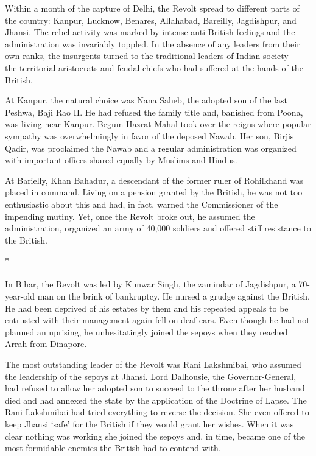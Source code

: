 \begin{multicols}{2}
Within a month of the capture of Delhi, the Revolt spread to different parts of the country: Kanpur, Lucknow, Benares, Allahabad, Bareilly, Jagdishpur, and Jhansi. The rebel activity was marked by intense anti-British feelings and the administration was invariably toppled. In the absence of any leaders from their own ranks, the insurgents turned to the traditional leaders of Indian society --- the territorial aristocrats and feudal chiefs who had suffered at the hands of the British.

At Kanpur, the natural choice was Nana Saheb, the adopted son of the last Peshwa, Baji Rao II. He had refused the family title and, banished from Poona, was living near Kanpur. Begum Hazrat Mahal took over the reigns where popular sympathy was overwhelmingly in favor of the deposed Nawab. Her son, Birjis Qadir, was proclaimed the Nawab and a regular administration was organized with important offices shared equally by Muslims and Hindus.

At Barielly, Khan Bahadur, a descendant of the former ruler of Rohilkhand was placed in command. Living on a pension granted by the British, he was not too enthusiastic about this and had, in fact, warned the Commissioner of the impending mutiny. Yet, once the Revolt broke out, he assumed the administration, organized an army of 40,000 soldiers and offered stiff resistance to the British.

\begin{center}*\end{center}

\paragraph*{}
In Bihar, the Revolt was led by Kunwar Singh, the zamindar of Jagdishpur, a 70-year-old man on the brink of bankruptcy. He nursed a grudge against the British. He had been deprived of his estates by them and his repeated appeals to be entrusted with their management again fell on deaf ears. Even though he had not planned an uprising, he unhesitatingly joined the sepoys when they reached Arrah from Dinapore.

The most outstanding leader of the Revolt was Rani Lakshmibai, who assumed the leadership of the sepoys at Jhansi. Lord Dalhousie, the Governor-General, had refused to allow her adopted son to succeed to the throne after her husband died and had annexed the state by the application of the Doctrine of Lapse. The Rani Lakshmibai had tried everything to reverse the decision. She even offered to keep Jhansi `safe' for the British if they would grant her wishes. When it was clear nothing was working she joined the sepoys and, in time, became one of the most formidable enemies the British had to contend with.


\end{multicols}
